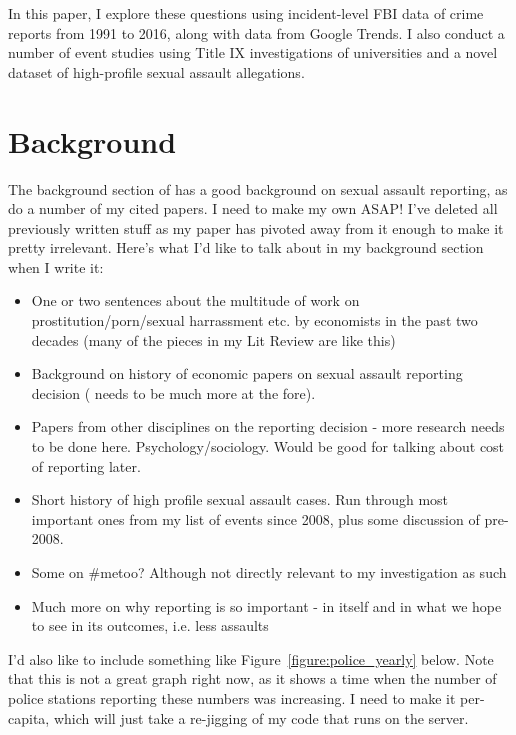 \documentclass[AER,draftmode]{AEA}
\begin{document}
In this paper, I explore these questions using incident-level FBI data of crime reports from 1991 to 2016, along with data from Google Trends. I also conduct a number of event studies using Title IX investigations of universities and a novel dataset of high-profile sexual assault allegations. 


\section{Background}

The background section of \cite{lindo_college_2018} has a good background on sexual assault reporting, as do a number of my cited papers. I need to make my own ASAP! I've deleted all previously written stuff as my paper has pivoted away from it enough to make it pretty irrelevant. Here's what I'd like to talk about in my background section when I write it:

\begin{itemize}
    \item One or two sentences about the multitude of work on prostitution/porn/sexual harrassment etc. by economists in the past two decades (many of the pieces in my Lit Review are like this)
    \item Background on history of economic papers on sexual assault reporting decision ( needs to be much more at the fore). 
    \item Papers from other disciplines on the reporting decision - more research needs to be done here. Psychology/sociology. Would be good for talking about cost of reporting later.
    \item Short history of high profile sexual assault cases. Run through most important ones from my list of events since 2008, plus some discussion of pre-2008.
    \item Some on #metoo? Although not directly relevant to my investigation as such
    \item Much more on why reporting is so important - in itself and in what we hope to see in its outcomes, i.e. less assaults
\end{itemize}

I'd also like to include something like Figure~\ref{figure:police_yearly} below. Note that this is not a great graph right now, as it shows a time when the number of police stations reporting these numbers was increasing. I need to make it per-capita, which will just take a re-jigging of my code that runs on the server. 
\end{document}
